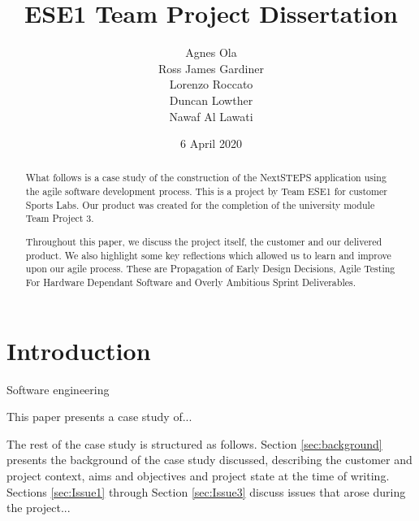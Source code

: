 \documentclass{l3proj}
\begin{document}
\title{ESE1 Team Project Dissertation}

\author{Agnes Ola \\
        Ross James Gardiner \\
        Lorenzo Roccato \\
        Duncan Lowther \\
        Nawaf Al Lawati}

\date{6 April 2020}

\maketitle

\begin{abstract}

What follows is a case study of the construction of the NextSTEPS application using the agile software development process. This is a project by Team ESE1 for customer Sports Labs. Our product was created for the completion of the university module Team Project 3. 

Throughout this paper, we discuss the project itself, the customer and our delivered product. We also highlight some key reflections which allowed us to learn and improve upon our agile process. These are Propagation of Early Design Decisions, Agile Testing For Hardware Dependant Software and Overly Ambitious Sprint Deliverables.  

\end{abstract}

\educationalconsent

\newpage
\section{Introduction}



Software engineering 

This paper presents a case study of... 

The rest of the case study is structured as follows.  Section
\ref{sec:background} presents the background of the case study
discussed, describing the customer and project context, aims and
objectives and project state at the time of writing.  Sections
\ref{sec:Issue1} through Section \ref{sec:Issue3} discuss issues that
arose during the project...
\end{document}
